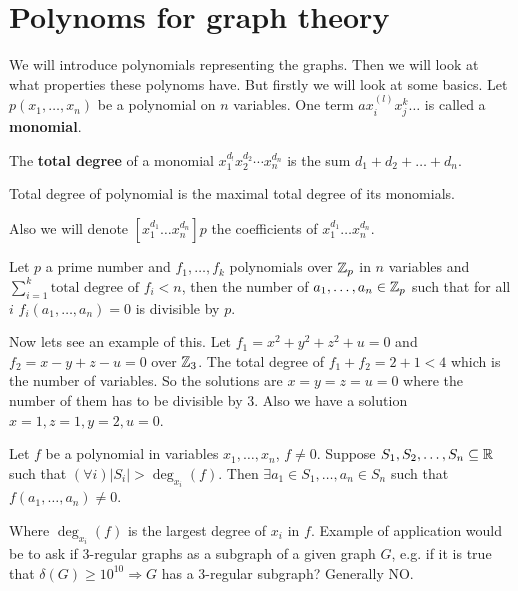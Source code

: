 \chapter{Polynoms for graph theory}

We will introduce polynomials representing the graphs. Then we will look at what properties these polynoms have. But firstly we will look at some basics. Let $p(x_{1}, \dots, x_{n})$ be a polynomial on $n$ variables. One term $ax_{i}^(l) x_{j}^k \dots$ is called a \textbf{monomial}.

\begin{defn}
	The \textbf{total degree} of a monomial $x_{1}^{d_{!}} x_{2}^{d_{2}} \cdots x_{n}^{d_{n}}$ is the sum $d_{1} + d_{2} + \dots + d_{n}$.
\end{defn}

\begin{defn}
	Total degree of polynomial is the maximal total degree of its monomials.
\end{defn}

Also we will denote $[x_{1}^{d_{1}} \dots x_{n}^{d_{n}}]p$ the coefficients of $x_{1}^{d_{1}} \dots x_{n}^{d_{n}}$.

\begin{thm}
	Let $p$ a prime number and $f_{1}, \dots, f_{k}$ polynomials over $\mathbb{Z}_{p}$ in $n$ variables and $\sum_{i = 1}^{k} \text{total degree of } f_{i} < n$, then the number of $a_{1}, \dots, a_{n} \in \mathbb{Z}_{p}$ such that for all $i$ $f_{i}(a_{1}, \dots, a_{n}) = 0$ is divisible by $p$.
\end{thm}

Now lets see an example of this. Let $f_{1} = x^2 + y^2 + z^2 + u =0$ and $f_{2} = x - y + z - u = 0$ over $\mathbb{Z}_{3}$. The total degree of $f_{1} + f_{2} = 2 + 1 < 4$ which is the number of variables. So the solutions are $x = y = z = u =0$ where the number of them has to be divisible by $3$. Also we have a solution $x = 1, z = 1, y = 2, u =0$.

\begin{thm}
	Let $f$ be a polynomial in variables $x_{1}, \dots, x_{n}$, $f \neq 0$. Suppose $S_{1}, S_{2}, \dots, S_{n} \subseteq \mathbb{R}$ such that $(\forall i) |S_{i}| > \deg_{x_{i}}(f)$. Then $\exists a_{1} \in S_{1}, \dots, a_{n} \in S_{n}$ such that $f(a_{1}, \dots, a_{n}) \neq 0$.
\end{thm}

Where $\deg_{x_{i}}(f)$ is the largest degree of $x_{i}$ in $f$. Example of application would be to ask if $3$-regular graphs as a subgraph of a given graph $G$, e.g. if it is true that $\delta(G) \geq 10^{10} \Rightarrow G$ has a $3$-regular subgraph? Generally NO.

